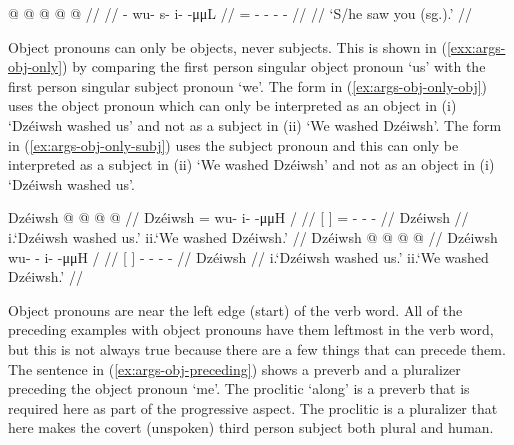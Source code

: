 \ex\label{ex:args-obj-prons-prefix}%
%
\begingl
	\gla	{} @ {} @ {} @ {} @ {} @ {} //	
	\glp	\llap{[}\rlap{\ipa{\gm{ʔì}w.sì.ˈtʰìːn}]} {} {} {} {} {} //
	\glb	{}- wu- s- i-  -μμL //
	\glc	{}= - - -  - //
	\gld	 {} {} {} {} {} {} //
	\glft	‘S/he saw you (sg.).’
		//
\endgl
\xe

Object pronouns can only be objects, never subjects. This is shown in (\ref{exx:args-obj-only}) by comparing the first person singular object pronoun  ‘us’ with the first person singular subject pronoun  ‘we’. The form in (\ref{ex:args-obj-only-obj}) uses the object pronoun  which can only be interpreted as an object in (i) ‘Dzéiwsh washed us’ and not as a subject in (ii) ‘We washed Dzéiwsh’. The form in (\ref{ex:args-obj-only-subj}) uses the subject pronoun  and this can only be interpreted as a subject in (ii) ‘We washed Dzéiwsh’ and not as an object in (i) ‘Dzéiwsh washed us’.

\pex\label{exx:args-obj-only}%
\a\label{ex:args-obj-only-obj}%
%
\begingl
	\gla	{} Dzéiwsh {}  @  @ {} @ {} @ {}  //
	\glb	{} Dzéiwsh {} = wu- i-  -μμH / //
	\glc	{}[  {}] = - -  - //
	\gld	{} Dzéiwsh {}   {} {} {}  //
	\glft	\phantom{i}i.\hspace{1em}‘Dzéiwsh washed us.’\newline
		ii.\hspace{1em}\ljudge{*}‘We washed Dzéiwsh.’
		//
\endgl
\a\label{ex:args-obj-only-subj}%
%
\begingl
	\gla	{} Dzéiwsh {}  @ {} @ {} @ {} @ {} //
	\glb	{} Dzéiwsh {} wu- - i-  -μμH / //
	\glc	{}[  {}] - - -  - //
	\gld	{} Dzéiwsh {}  {} {} {} {} //
	\glft	\phantom{i}i.\hspace{1em}\ljudge{*}‘Dzéiwsh washed us.’\newline
		ii.\hspace{1em}‘We washed Dzéiwsh.’
		//
\endgl
\xe

Object pronouns are near the left edge (start) of the verb word. All of the preceding examples with object pronouns have them leftmost in the verb word, but this is not always true because there are a few things that can precede them. The sentence in (\ref{ex:args-obj-preceding}) shows a preverb and a pluralizer preceding the object pronoun  ‘me’. The proclitic  ‘along’ is a preverb that is required here as part of the progressive aspect. The proclitic  is a pluralizer that here makes the covert (unspoken) third person subject both plural and human.

